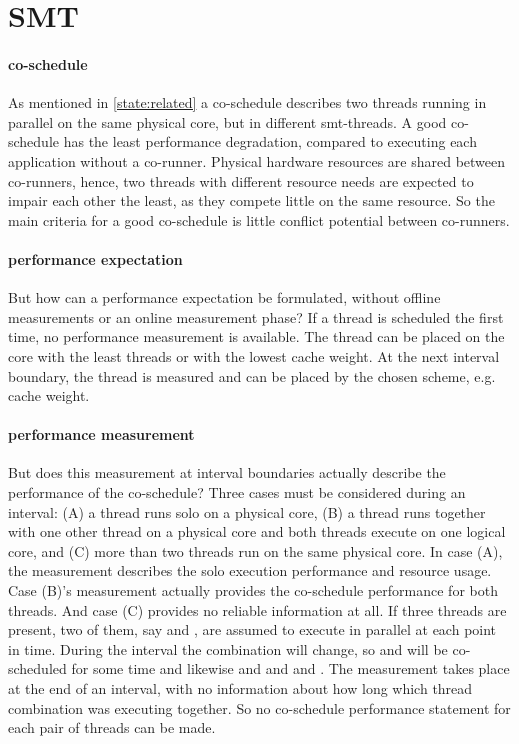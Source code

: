 \section{SMT}
\label{design:smt}

\paragraph{co-schedule}
As mentioned in \ref{state:related} a co-schedule describes two threads running
in parallel on the same physical core, but in different \gls{smt}-threads.
A good co-schedule has the least performance degradation,
compared to executing each application without a co-runner.
Physical hardware resources are shared between co-runners, hence, two threads with
different resource needs are expected to impair each other the least, as they
compete little on the same resource.
So the main criteria for a good co-schedule is little conflict potential
between co-runners.

\paragraph{performance expectation}
But how can a performance expectation be formulated, without offline
measurements or an online measurement phase?
If a thread is scheduled the first time, no performance measurement is
available.
The thread can be placed on the core with the least threads or with the lowest
cache weight. 
At the next interval boundary, the thread is measured and can be placed by the
chosen scheme, e.g. cache weight.

\paragraph{performance measurement}
But does this measurement at interval boundaries actually describe the
performance of the co-schedule?
Three cases must be considered during an interval:
(A) a thread runs solo on a physical core,
(B) a thread runs together with one other thread on a physical core and both
threads execute on one logical core, and
(C) more than two threads run on the same physical core.
In case (A), the measurement describes the solo execution performance and
resource usage.
Case (B)'s measurement actually provides the co-schedule performance for both
threads.
And case (C) provides no reliable information at all.
If three threads are present, two of them, say \alpha{} and \beta{}, are assumed to
execute in parallel at each point in time.
During the interval the combination will change, so \alpha{} and \gamma{} will be
co-scheduled for some time and likewise \beta{} and \gamma{} and \alpha{} and
\beta{}.
The measurement takes place at the end of an interval, with no information
about how long which thread combination was executing together. So no
co-schedule performance statement for each pair of threads can be made.

